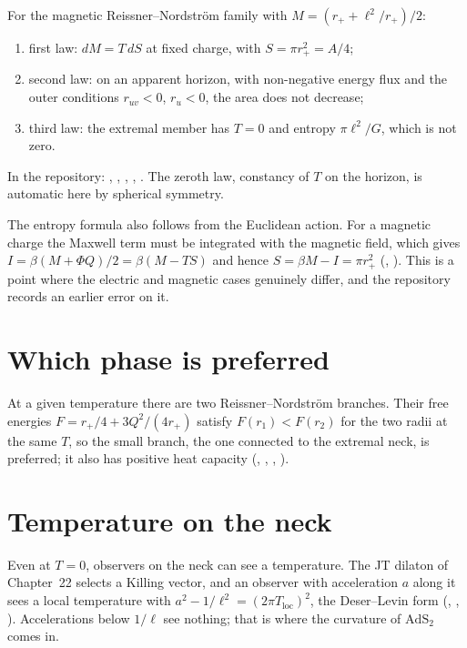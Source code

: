 \begin{theorem}\proved
For the magnetic Reissner--Nordstr\"om family with $M=(r_++\ell^2/r_+)/2$:
\begin{enumerate}[label=(\roman*)]
\item first law: $dM=T\,dS$ at fixed charge, with $S=\pi r_+^2=A/4$;
\item second law: on an apparent horizon, with non-negative energy flux and the outer conditions $r_{uv}<0$, $r_u<0$, the area does not decrease;
\item third law: the extremal member has $T=0$ and entropy $\pi\ell^2/G$, which is not zero.
\end{enumerate}
\end{theorem}
\noindent In the repository: , , , , . The zeroth law, constancy of $T$ on the horizon, is automatic here by spherical symmetry.

The entropy formula also follows from the Euclidean action. For a magnetic charge the Maxwell term must be integrated with the magnetic field, which gives $I=\beta(M+\Phi Q)/2=\beta(M-TS)$ and hence $S=\beta M-I=\pi r_+^2$ (, ). This is a point where the electric and magnetic cases genuinely differ, and the repository records an earlier error on it.

\section{Which phase is preferred}

At a given temperature there are two Reissner--Nordstr\"om branches. Their free energies $F=r_+/4+3Q^2/(4r_+)$ satisfy $F(r_1)<F(r_2)$ for the two radii at the same $T$, so the small branch, the one connected to the extremal neck, is preferred; it also has positive heat capacity (, , , ).

\section{Temperature on the neck}

Even at $T=0$, observers on the neck can see a temperature. The JT dilaton of Chapter~22 selects a Killing vector, and an observer with acceleration $a$ along it sees a local temperature with $a^2-1/\ell^2=(2\pi T_{\mathrm{loc}})^2$, the Deser--Levin form (, , ). Accelerations below $1/\ell$ see nothing; that is where the curvature of $\mathrm{AdS}_2$ comes in.

